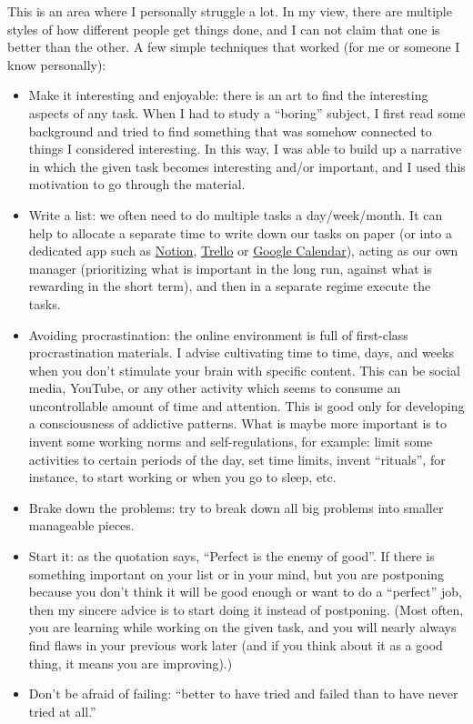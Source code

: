 \documentclass{article}
\begin{document}
This is an area where I personally struggle a lot. In my view, there are multiple styles of how different people get things done, and I can not claim that one is better than the other.
A few simple techniques that worked (for me or someone I know personally):
\begin{itemize}
    \item Make it interesting and enjoyable: there is an art to find the interesting aspects of any task. When I had to study a ``boring'' subject, I first read some background and tried to find something that was somehow connected to things I considered interesting. In this way, I was able to build up a narrative in which the given task becomes interesting and/or important, and I used this motivation to go through the material.
    
    \item Write a list: we often need to do multiple tasks a day/week/month. It can help to allocate a separate time to write down our tasks on paper (or into a dedicated app such as \href{https://www.notion.so/}{Notion}, \href{https://trello.com/}{Trello} or \href{https://calendar.google.com/}{Google Calendar}), acting as our own manager (prioritizing what is important in the long run, against what is rewarding in the short term), and then in a separate regime execute the tasks.
    
    \item Avoiding procrastination: the online environment is full of first-class procrastination materials. I advise cultivating time to time, days, and weeks when you don't stimulate your brain with specific content. This can be social media, YouTube, or any other activity which seems to consume an uncontrollable amount of time and attention. This is good only for developing a consciousness of addictive patterns. What is maybe more important is to invent some working norms and self-regulations, for example: limit some activities to certain periods of the day, set time limits, invent ``rituals'', for instance, to start working or when you go to sleep, etc.
    
    \item Brake down the problems: try to break down all big problems into smaller manageable pieces.
    
    \item Start it: as the quotation says, ``Perfect is the enemy of good''. If there is something important on your list or in your mind, but you are postponing because you don't think it will be good enough or want to do a ``perfect'' job, then my sincere advice is to start doing it instead of postponing. (Most often, you are learning while working on the given task, and you will nearly always find flaws in your previous work later (and if you think about it as a good thing, it means you are improving).)
    
    \item Don't be afraid of failing: ``better to have tried and failed than to have never tried at all.''
\end{itemize}
\end{document}
